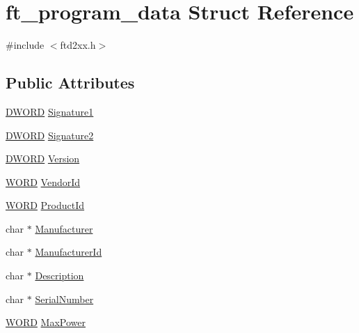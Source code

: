 \hypertarget{structft__program__data}{}\section{ft\+\_\+program\+\_\+data Struct Reference}
\label{structft__program__data}


{\ttfamily \#include $<$ftd2xx.\+h$>$}

\subsection*{Public Attributes}
\begin{DoxyCompactItemize}
\item 
\hyperlink{CatCaloProto40MHz_2inc_2WinTypes_8h_ad342ac907eb044443153a22f964bf0af}{D\+W\+O\+RD} \hyperlink{structft__program__data_a6b26e04c691ec5944d2fffec797c399a}{Signature1}
\item 
\hyperlink{CatCaloProto40MHz_2inc_2WinTypes_8h_ad342ac907eb044443153a22f964bf0af}{D\+W\+O\+RD} \hyperlink{structft__program__data_ab28a0f4509093050f1927f1e946f3d9f}{Signature2}
\item 
\hyperlink{CatCaloProto40MHz_2inc_2WinTypes_8h_ad342ac907eb044443153a22f964bf0af}{D\+W\+O\+RD} \hyperlink{structft__program__data_a9ef2eb59fe9ef1699df92a9d50ac3a81}{Version}
\item 
\hyperlink{CatCaloProto40MHz_2inc_2WinTypes_8h_a197942eefa7db30960ae396d68339b97}{W\+O\+RD} \hyperlink{structft__program__data_a4d4e65a934b3a822d90d2b2fc461cb11}{Vendor\+Id}
\item 
\hyperlink{CatCaloProto40MHz_2inc_2WinTypes_8h_a197942eefa7db30960ae396d68339b97}{W\+O\+RD} \hyperlink{structft__program__data_a623b7980fadab4322ed41da598b45397}{Product\+Id}
\item 
char $\ast$ \hyperlink{structft__program__data_a803860e98c4c7be38685b9c69e4684a5}{Manufacturer}
\item 
char $\ast$ \hyperlink{structft__program__data_a2e84082e1e7b7c8e117c19a536813da5}{Manufacturer\+Id}
\item 
char $\ast$ \hyperlink{structft__program__data_a254c31fdadcc3ce3748f6682083874a8}{Description}
\item 
char $\ast$ \hyperlink{structft__program__data_a81ddee025aa0fa0b48189fb0ee7c5b46}{Serial\+Number}
\item 
\hyperlink{CatCaloProto40MHz_2inc_2WinTypes_8h_a197942eefa7db30960ae396d68339b97}{W\+O\+RD} \hyperlink{structft__program__data_a95bf98d9c0b056d68078bc2d2f66b20e}{Max\+Power}

\end{DoxyCompactItemize}
